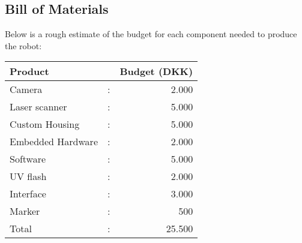\subsection{Bill of Materials}
Below is a rough estimate of the budget for each component needed to produce the robot:
\begin{center}
\begin{tabular}{l c r}
Product           &   & Budget (DKK)\\
\hline
Camera            & : & 2.000  \\
Laser scanner     & : & 5.000 \\
Custom Housing    & : & 5.000\\
Embedded Hardware & : & 2.000\\
Software          & : & 5.000\\
UV flash          & : & 2.000\\
Interface         & : & 3.000\\
Marker            & : & 500\\[0.2cm]
\hline
Total             & : & 25.500\\ 
\end{tabular}
\end{center}

%
